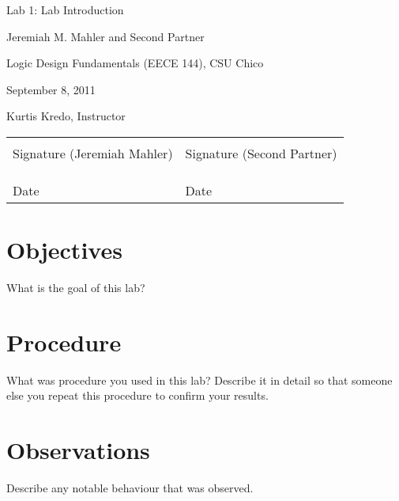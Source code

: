 \documentclass[12pt]{article}
\begin{document}

\null
\thispagestyle{empty}
\vfill
\centerline{\LARGE Lab 1: Lab Introduction}
\vspace{0.3in}
\centerline{Jeremiah M. Mahler and Second Partner}
\centerline{Logic Design Fundamentals (EECE 144), CSU Chico}
\centerline{September 8, 2011}
\centerline{Kurtis Kredo, Instructor}
\vspace{5in}

\begin{center}
\begin{tabular}{l l}
\uline{\hspace{2.5in}} & \uline{\hspace{2.5in}} \\
Signature (Jeremiah Mahler) & Signature (Second Partner) \\
& \\
& \\
\uline{\hspace{2.5in}} & \uline{\hspace{2.5in}} \\
Date & Date \\
\end{tabular}
\end{center}

\vfill  %
\pagebreak

\tableofcontents

\pagebreak

\section{Objectives}

What is the goal of this lab?

\section{Procedure}

What was procedure you used in this lab?
Describe it in detail so that someone else you repeat
this procedure to confirm your results.

\section{Observations}

Describe any notable behaviour that was observed.
\end{document}
